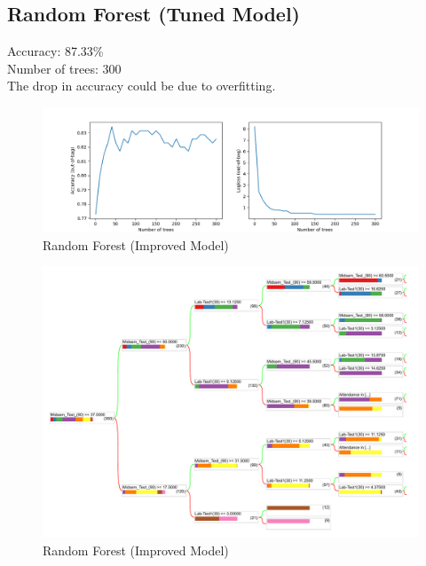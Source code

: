 \documentclass{assignmeownt}
\begin{document}
\subsection{Random Forest (Tuned Model)}
Accuracy: 87.33\% \\
Number of trees: 300 \\
The drop in accuracy could be due to overfitting. \\
\begin{figure}[h]
    \centering
    \includegraphics[width=\textwidth]{images/tunedModelAcc.png}
    \caption{Random Forest (Improved Model)}
    \label{fig:2}
\end{figure}
\begin{figure}[H]
    \centering
    \includegraphics[width=\textwidth]{images/imprModel.pdf}
    \caption{Random Forest (Improved Model)}
    \label{fig:6}
\end{figure}
\end{document}
